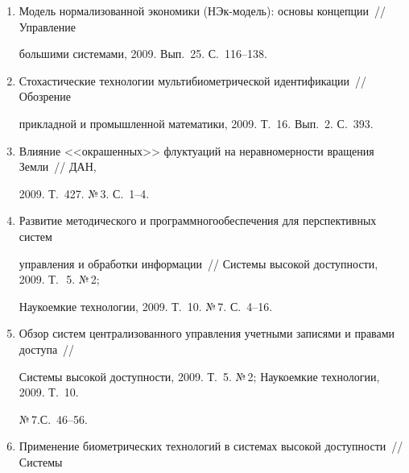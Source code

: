 \begin{enumerate}[1.]
\item {}


Модель нормализованной экономики (НЭк-мо\-дель): основы концепции~// Управление 


большими системами, 2009. Вып.~25. С.~116--138.





\item {}


Стохастические технологии мультибиометрической идентификации~// Обозрение 


прикладной и промышленной математики, 2009. Т.~16. Вып.~2. С.~393.





\item {}


Влияние <<окрашенных>> флуктуаций на неравномерности вращения Земли~// ДАН, 


2009. Т.~427. №\,3. С.~1--4.





\item {}


Развитие методического и программного\linebreak обеспечения для перспективных систем 


управления и обработки информации~// Системы высокой доступности, 2009. Т.~\,5. №\,2; 


Наукоемкие технологии, 2009. Т.~10. №\,7. С.~4--16.





\item {}


Обзор систем централизованного управления учетными записями и правами доступа~// 


Системы высокой доступности, 2009. Т.~5. №\,2;  Наукоемкие технологии, 2009. Т.~10. 


№\,7.\linebreak С.~46--56.





\item {}


Применение биометрических технологий в системах высокой доступности~// Системы 



\end{enumerate}
